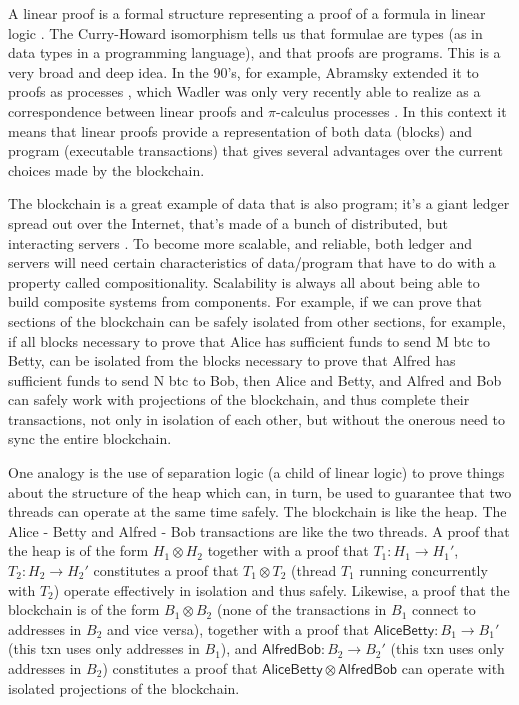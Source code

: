 \documentclass[]{acm_proc_article-sp}
\numberwithin{equation}{subsection}
\begin{document}
A linear proof is a formal structure representing a proof of a formula
in linear logic \cite{DBLP:journals/tcs/Girard87}.  The Curry-Howard
isomorphism \cite{Sorensen98lectureson} tells us that formulae are
types (as in data types in a programming language), and that proofs
are programs. This is a very broad and deep idea. In the 90's, for
example, Abramsky extended it to proofs as processes
\cite{DBLP:journals/tcs/Abramsky94}, which Wadler was only very
recently able to realize as a correspondence between linear proofs and
{$\pi$}-calculus processes \cite{DBLP:journals/jfp/Wadler14}. In this
context it means that linear proofs provide a representation of both
data (blocks) and program (executable transactions) that gives several
advantages over the current choices made by the blockchain.

The blockchain is a great example of data that is also program; it's a
giant ledger spread out over the Internet, that's made of a bunch of
distributed, but interacting servers \cite{Nakamoto2008}. To become
more scalable, and reliable, both ledger and servers will need certain
characteristics of data/program that have to do with a property called
compositionality. Scalability is always all about being able to build
composite systems from components. For example, if we can prove that
sections of the blockchain can be safely isolated from other sections,
for example, if all blocks necessary to prove that Alice has
sufficient funds to send M btc to Betty, can be isolated from the
blocks necessary to prove that Alfred has sufficient funds to send N
btc to Bob, then Alice and Betty, and Alfred and Bob can safely work
with projections of the blockchain, and thus complete their
transactions, not only in isolation of each other, but without the
onerous need to sync the entire blockchain.

One analogy is the use of separation logic (a child of linear logic)
\cite{DBLP:conf/vstte/Reynolds05} to prove things about the structure
of the heap which can, in turn, be used to guarantee that two threads
can operate at the same time safely. The blockchain is like the
heap. The Alice - Betty and Alfred - Bob transactions are like the two
threads. A proof that the heap is of the form $H_1 \otimes H_2$
together with a proof that $T_1 : H_1 \rightarrow H_1'$, $T_2 : H_2
\rightarrow H_2'$ constitutes a proof that $T_1 \otimes T_2$ (thread
$T_1$ running concurrently with $T_2$) operate effectively in
isolation and thus safely. Likewise, a proof that the blockchain is of
the form $B_1 \otimes B_2$ (none of the transactions in $B_1$ connect to
addresses in $B_2$ and vice versa), together with a proof that
$\mathsf{AliceBetty} : B_1 \rightarrow B_1'$ (this txn uses only addresses
in $B_1$), and $\mathsf{AlfredBob} : B_2 \rightarrow B_2'$ (this txn uses
only addresses in $B_2$) constitutes a proof that $\mathsf{AliceBetty}
\otimes \mathsf{AlfredBob}$ can operate with isolated projections of the
blockchain.
\end{document}
